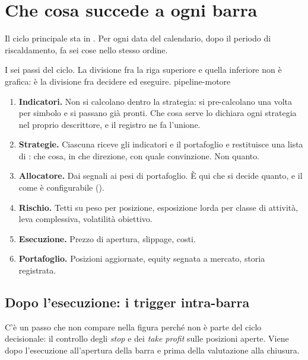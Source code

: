 \section{Che cosa succede a ogni barra}\label{sez:barra}

Il ciclo principale sta in . Per ogni data del
calendario, dopo il periodo di riscaldamento, fa sei cose nello stesso ordine.

  {I sei passi del ciclo. La divisione fra la riga superiore e quella
   inferiore non è grafica: è la divisione fra decidere ed eseguire.}
  {pipeline-motore}

\begin{enumerate}
  \item \textbf{Indicatori.} Non si calcolano dentro la strategia: si
        pre-calcolano una volta per simbolo e si passano già pronti. Che cosa
        serve lo dichiara ogni strategia nel proprio descrittore, e il
        registro ne fa l'unione.
  \item \textbf{Strategie.} Ciascuna riceve gli indicatori e il portafoglio e
        restituisce una lista di : che cosa, in che
        direzione, con quale convinzione. Non quanto.
  \item \textbf{Allocatore.} Dai segnali ai pesi di portafoglio. È qui che
        si decide quanto, e il come è configurabile
        ().
  \item \textbf{Rischio.} Tetti su peso per posizione, esposizione lorda per
        classe di attività, leva complessiva, volatilità obiettivo.
  \item \textbf{Esecuzione.} Prezzo di apertura, slippage, costi.
  \item \textbf{Portafoglio.} Posizioni aggiornate, equity segnata a mercato,
        storia registrata.
\end{enumerate}

\subsection{Dopo l'esecuzione: i trigger intra-barra}\label{sez:barra-trigger}

C'è un passo che non compare nella figura perché non è parte del ciclo
decisionale: il controllo degli \emph{stop} e dei \emph{take profit} sulle
posizioni aperte. Viene dopo l'esecuzione all'apertura della barra e prima
della valutazione alla chiusura.

